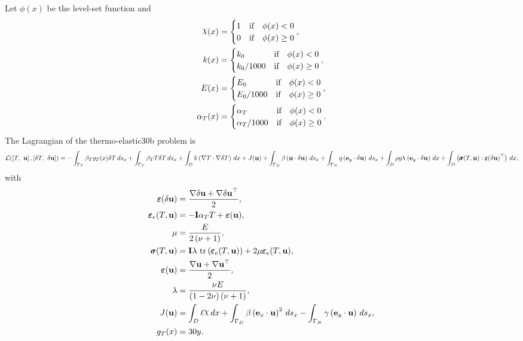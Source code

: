 \documentclass[preview]{standalone}
\let\oldcdot\cdot
\let\cdot\oldcdot
\begin{document}
Let $\phi(x)$ be the level-set function and
 \begin{align*}\raisebox{\depth}{$\chi$}(x) &= \begin{cases} 1 & \mbox{if}\quad \phi(x) < 0 \\ 0 & \mbox{if}\quad \phi(x)  \ge 0 \end{cases},\\
k(x) &= \begin{cases} k_0 & \mbox{if}\quad \phi(x) < 0 \\ k_0/1000 & \mbox{if}\quad \phi(x)  \ge 0 \end{cases},\\
E(x) &= \begin{cases} E_0 & \mbox{if}\quad \phi(x) < 0 \\ E_0/1000 & \mbox{if}\quad \phi(x)  \ge 0 \end{cases},\\
\alpha_{T}(x) &= \begin{cases} \alpha_T & \mbox{if}\quad \phi(x) < 0 \\ \alpha_T/1000 & \mbox{if}\quad \phi(x)  \ge 0 \end{cases}.\end{align*}
The Lagrangian of the thermo-elastic30b problem is
\begin{dmath*}
\mathcal L(\left[ T, \  {\mathbf{ u }}\right],\left[ \delta T, \  {\delta\mathbf{  u }}\right]) = -  \int_{\Gamma_{T}} \beta_{T} g_{T}(x) \delta T \,ds_x +  \int_{\Gamma_{T}} \beta_{T} T \delta T \,ds_x +  \int_{D} k \left(  \nabla T  \cdot  \nabla \delta T  \right) \,dx + J({\mathbf{ u }}) +  \int_{\Gamma_D} \beta \left( {\mathbf{ u }} \cdot {\delta\mathbf{  u }} \right) \,ds_x +  \int_{\Gamma_N} q \left( \mathbf e_y \cdot {\delta\mathbf{  u }} \right) \,ds_x +  \int_{D} \rho g \raisebox{\depth}{$\chi$} \left( \mathbf e_y \cdot {\delta\mathbf{  u }} \right) \,dx +  \int_{D} \left( \pmb \sigma(T,{\mathbf{ u }}) \mathrel{:}  \pmb\varepsilon({\delta\mathbf{  u }})^\top  \right) \,dx , 
\end{dmath*}
with 
\begin{align*}
\pmb\varepsilon({\delta\mathbf{  u }}) &= \frac{ \nabla {\delta\mathbf{  u }}  +   \nabla {\delta\mathbf{  u }} ^\top }{2},\\
\pmb\varepsilon_{e}(T,{\mathbf{ u }}) &= - \mathbf{I} \alpha_{T} T + \bm\varepsilon({\mathbf{ u }}),\\
\mu &= \frac{E}{2 \left(\nu + 1\right)},\\
\pmb \sigma(T,{\mathbf{ u }}) &= \mathbf{I} \lambda  \,\operatorname{tr}\left(\pmb\varepsilon_{e}(T,{\mathbf{ u }})\right)  + 2 \mu \pmb\varepsilon_{e}(T,{\mathbf{ u }}),\\
\bm\varepsilon({\mathbf{ u }}) &= \frac{ \nabla {\mathbf{ u }}  +   \nabla {\mathbf{ u }} ^\top }{2},\\
\lambda &= \frac{\nu E}{\left(1 - 2 \nu\right) \left(\nu + 1\right)},\\
J({\mathbf{ u }}) &=  \int_{D} \ell \raisebox{\depth}{$\chi$} \,dx +  \int_{\Gamma_D} \beta \left( \mathbf e_x \cdot {\mathbf{ u }} \right)^{2} \,ds_x -  \int_{\Gamma_N} \gamma \left( \mathbf e_y \cdot {\mathbf{ u }} \right) \,ds_x,\\
g_{T}(x) &= 30 y.
 \end{align*}
\end{document}
